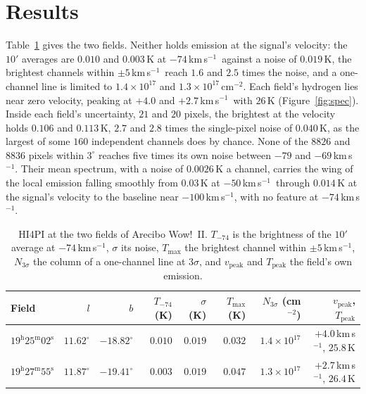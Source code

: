 \documentclass[3p,11pt]{elsarticle}
\newcommand{\kms}{km\,s$^{-1}$}
\begin{document}
\section{Results}\label{sec:results}

Table~\ref{tab:fields} gives the two fields. Neither holds emission at the signal's
velocity: the $10'$ averages are $0.010$ and $0.003$\,K at $-74$\,\kms\ against a noise
of $0.019$\,K, the brightest channels within $\pm5$\,\kms\ reach $1.6$ and $2.5$ times
the noise, and a one-channel line is limited to $1.4\times10^{17}$ and
$1.3\times10^{17}$\,cm$^{-2}$. Each field's hydrogen lies near zero velocity, peaking at
$+4.0$ and $+2.7$\,\kms\ with $26$\,K (Figure~\ref{fig:spec}). Inside each field's
uncertainty, $21$ and $20$ pixels, the brightest at the velocity holds $0.106$ and
$0.113$\,K, $2.7$ and $2.8$ times the single-pixel noise of $0.040$\,K, as the largest of
some $160$ independent channels does by chance. None of the $8826$ and $8836$ pixels
within $3^\circ$ reaches five times its own noise between $-79$ and $-69$\,\kms. Their
mean spectrum, with a noise of $0.0026$\,K a channel, carries the wing of the local
emission falling smoothly from $0.03$\,K at $-50$\,\kms\ through $0.014$\,K at the
signal's velocity to the baseline near $-100$\,\kms, with no feature at $-74$\,\kms.

\begin{table}[t]
\centering\small
\caption{HI4PI at the two fields of Arecibo Wow!~II. $T_{-74}$ is the brightness of the
$10'$ average at $-74$\,\kms, $\sigma$ its noise, $T_\mathrm{max}$ the brightest channel
within $\pm5$\,\kms, $N_{3\sigma}$ the column of a one-channel line at $3\sigma$, and
$v_\mathrm{peak}$ and $T_\mathrm{peak}$ the field's own emission.}
\label{tab:fields}
\begin{tabular}{lrrrrrrr}
\toprule
Field & $l$ & $b$ & $T_{-74}$ (K) & $\sigma$ (K) & $T_\mathrm{max}$ (K) & $N_{3\sigma}$ (cm$^{-2}$) & $v_\mathrm{peak}$, $T_\mathrm{peak}$ \\
\midrule
$19^\mathrm{h}25^\mathrm{m}02^\mathrm{s}$ & $11.62^\circ$ & $-18.82^\circ$ & $0.010$ & $0.019$ & $0.032$ & $1.4\times10^{17}$ & $+4.0$\,\kms, $25.8$\,K \\
$19^\mathrm{h}27^\mathrm{m}55^\mathrm{s}$ & $11.87^\circ$ & $-19.41^\circ$ & $0.003$ & $0.019$ & $0.047$ & $1.3\times10^{17}$ & $+2.7$\,\kms, $26.4$\,K \\
\bottomrule
\end{tabular}
\end{table}
\end{document}
